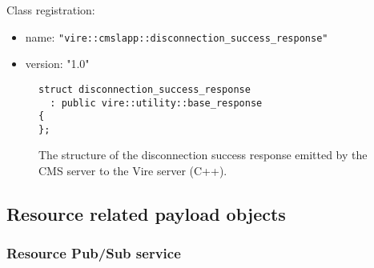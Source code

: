 \begin{itemize}
\begin{center}
\end{center}


\noindent Class registration:
\begin{itemize}
\item name: \texttt{"vire::cmslapp::disconnection\_success\_response"}
\item version: "1.0"
\end{itemize}

\begin{figure}[h]
\vskip 10pt
\small
\begin{Verbatim}[frame=single,xleftmargin=0.cm,label=\fbox{C++}]
struct disconnection_success_response
  : public vire::utility::base_response
{
};
\end{Verbatim}
\normalsize
\caption{The structure  of the disconnection success  response emitted by
  the CMS server to the Vire server (C++).}
\label{fig-app-payload-disconnection_success_response}
\end{figure}


\end{itemize}


\vfill
\pagebreak
\clearpage

\subsection{Resource related payload objects}

\subsubsection{Resource Pub/Sub service}

